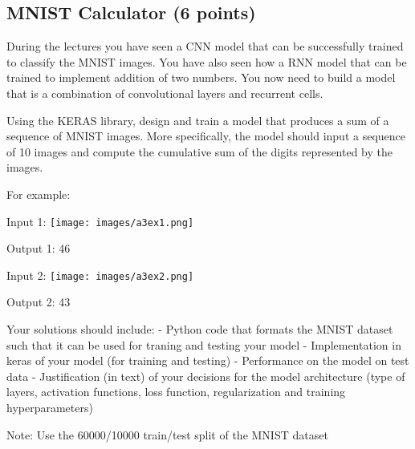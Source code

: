\documentclass[11pt]{article}
\begin{document}
    \hypertarget{mnist-calculator-6-points}{%
\subsection{MNIST Calculator (6
points)}\label{mnist-calculator-6-points}}

During the lectures you have seen a CNN model that can be successfully
trained to classify the MNIST images. You have also seen how a RNN model
that can be trained to implement addition of two numbers. You now need
to build a model that is a combination of convolutional layers and
recurrent cells.

Using the KERAS library, design and train a model that produces a sum of
a sequence of MNIST images. More specifically, the model should input a
sequence of 10 images and compute the cumulative sum of the digits
represented by the images.

For example:

Input 1: \texttt{[image: images/a3ex1.png]}

Output 1: 46

Input 2: \texttt{[image: images/a3ex2.png]}

Output 2: 43

Your solutions should include: - Python code that formats the MNIST
dataset such that it can be used for traning and testing your model -
Implementation in keras of your model (for training and testing) -
Performance on the model on test data - Justification (in text) of your
decisions for the model architecture (type of layers, activation
functions, loss function, regularization and training hyperparameters)

Note: Use the 60000/10000 train/test split of the MNIST dataset
\end{document}
